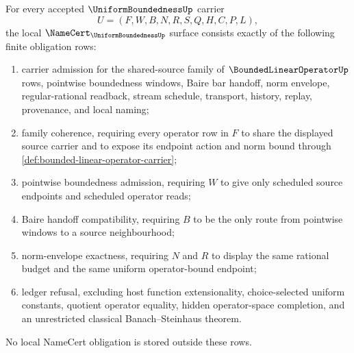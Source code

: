 \begin{theorem}
\label{thm:uniform-boundedness-namecert-obligations}
For every accepted $\UniformBoundednessUp$ carrier
$$
U=(F,W,B,N,R,S,Q,H,C,P,L),
$$
the local $\NameCert_{\UniformBoundednessUp}$ surface consists exactly of the following finite obligation rows:
\begin{enumerate}
\item carrier admission for the shared-source family of $\BoundedLinearOperatorUp$ rows, pointwise boundedness windows, Baire bar handoff, norm envelope, regular-rational readback, stream schedule, transport, history, replay, provenance, and local naming;
\item family coherence, requiring every operator row in $F$ to share the displayed source carrier and to expose its endpoint action and norm bound through \autoref{def:bounded-linear-operator-carrier};
\item pointwise boundedness admission, requiring $W$ to give only scheduled source endpoints and scheduled operator reads;
\item Baire handoff compatibility, requiring $B$ to be the only route from pointwise windows to a source neighbourhood;
\item norm-envelope exactness, requiring $N$ and $R$ to display the same rational budget and the same uniform operator-bound endpoint;
\item ledger refusal, excluding host function extensionality, choice-selected uniform constants, quotient operator equality, hidden operator-space completion, and an unrestricted classical Banach--Steinhaus theorem.
\end{enumerate}
No local NameCert obligation is stored outside these rows.
\end{theorem}
